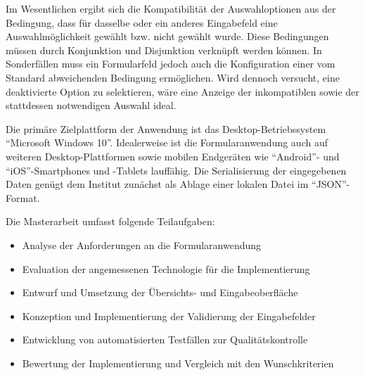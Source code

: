 \vspace{14pt}

Im Wesentlichen ergibt sich die Kompatibilität 
der Auswahloptionen aus der Bedingung, 
dass für dasselbe oder ein anderes Eingabefeld eine Auswahlmöglichkeit gewählt bzw.
nicht gewählt wurde. Diese Bedingungen müssen durch 
Konjunktion und Disjunktion verknüpft werden können.
In Sonderfällen muss ein Formularfeld jedoch auch 
die Konfiguration einer vom Standard abweichenden Bedingung
ermöglichen. 
Wird dennoch versucht,
eine deaktivierte Option zu selektieren, wäre eine Anzeige der
inkompatiblen sowie der stattdessen notwendigen Auswahl ideal.

\vspace{14pt}
Die primäre Zielplattform der Anwendung ist das Desktop-Betriebssystem
\enquote{Microsoft Windows 10}.
Idealerweise ist die Formularanwendung auch auf weiteren Desktop-Plattformen sowie
mobilen Endgeräten wie \enquote{Android}- und \enquote{iOS}-Smartphones und -Tablets
lauffähig. Die Serialisierung der eingegebenen Daten genügt dem Institut 
zunächst als Ablage einer lokalen Datei im \enquote{JSON}-Format. 


\vspace{14pt}
Die Masterarbeit umfasst folgende Teilaufgaben:
\begin{itemize}
    \itemsep0em
\item Analyse der Anforderungen an die Formularanwendung
\item Evaluation der angemessenen Technologie für die Implementierung
\item Entwurf und Umsetzung der Übersichts- und Eingabeoberfläche
\item Konzeption und Implementierung der Validierung der Eingabefelder
\item Entwicklung von automatisierten Testfällen zur Qualitätskontrolle
\item Bewertung der Implementierung und Vergleich mit den Wunschkriterien
\end{itemize}








